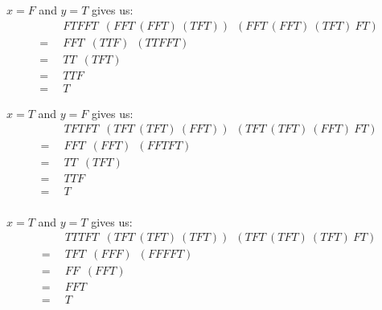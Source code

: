 \documentclass[11pt]{article}
\begin{document}
\(x=F\) and \(y=T\) gives us:
\begin{align*}
	&\enspace FTFFT\enspace
		(FFT\:(FFT)\:(TFT))\enspace
		(FFT\:(FFT)\:(TFT)\:FT)\\
	=&\enspace FFT\enspace(TTF)\enspace(TTFFT)\\
	=&\enspace TT\enspace(TFT)\\
	=&\enspace TTF\\
	=&\enspace T
\end{align*}

\(x=T\) and \(y=F\) gives us:
\begin{align*}
	&\enspace TFTFT\enspace
		(TFT\:(TFT)\:(FFT))\enspace
		(TFT\:(TFT)\:(FFT)\:FT)\\
	=&\enspace FFT\enspace(FFT)\enspace(FFTFT)\\
	=&\enspace TT\enspace(TFT)\\
	=&\enspace TTF\\
	=&\enspace T\\
\end{align*}

\(x=T\) and \(y=T\) gives us:
\begin{align*}
	&\enspace TTTFT\enspace
		(TFT\:(TFT)\:(TFT))\enspace
		(TFT\:(TFT)\:(TFT)\:FT)\\
	=&\enspace TFT\enspace(FFF)\enspace(FFFFT)\\
	=&\enspace FF\enspace(FFT)\\
	=&\enspace FFT\\
	=&\enspace T
\end{align*}
\end{document}
